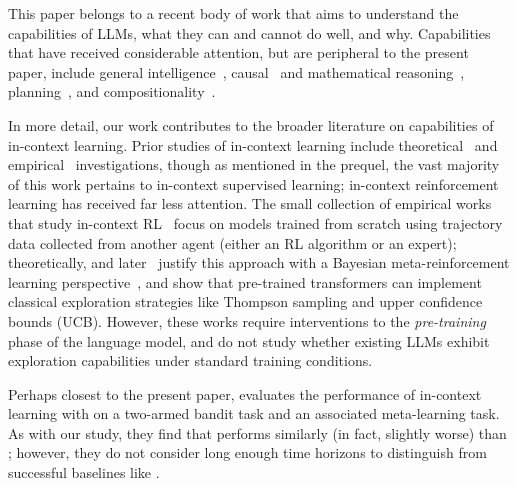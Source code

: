 This paper belongs to a recent body of work that aims to understand the capabilities of LLMs, \ie what they can and cannot do well, and why.
Capabilities that have received considerable attention, but are peripheral to the present paper, include general intelligence~\citep{bubeck2023sparks,binz2023using}, causal~\citep{kiciman2023causal,yiu2023imitation} and mathematical reasoning~\citep{cobbe2021training,lu2023mathvista}, planning~\citep{valmeekam2023planbench,momennejad2023evaluating,brooks2023large}, and compositionality~\citep{yu2023skill}.

In more detail, our work contributes to the broader literature on capabilities of in-context learning.
Prior studies of in-context learning include theoretical~\citep{xie2021explanation,akyurek2022learning,zhang2023and,abernethy2023mechanism,zhang2023trained,han2023explaining,cheng2023transformers,ahn2023transformers,wies2023learnability,fu2023transformers,wu2023many,huang2023context,hendel2023context,li2023transformers,von2023transformers,bai2023transformers,hahn2023theory,jeon2024information} and empirical~\citep{garg2022can,kirsch2022general,ahuja2023context,han2023understanding,raventos2023pretraining,weber2023icl,bhattamishra2023understanding,guo2023transformers,shen2023pretrained,akyurek2024context} investigations, though as
mentioned in the prequel, the vast majority of this work pertains to in-context
supervised learning; in-context reinforcement learning has received far less attention. The small collection of empirical
works that study in-context RL~\citep{laskin2022context,lee2023supervised,raparthy2023generalization,xu2022prompting} focus on models trained from scratch using trajectory data collected
from another agent (either an RL algorithm or an
expert); theoretically, \citet{lee2023supervised} and
later~\citet{lin2023transformers} justify this approach with a Bayesian
meta-reinforcement learning perspective~\citep{simchowitz2021bayesian},
and show that pre-trained transformers can implement classical
exploration strategies like Thompson sampling and upper confidence
bounds (UCB). However, these works require interventions to the
\emph{pre-training} phase of the language model, and do not study
whether existing LLMs exhibit exploration capabilities under standard
training conditions.

Perhaps closest to the present paper, \citet{coda2023meta} evaluates the performance of in-context learning with \gptthree on a two-armed bandit task and an associated meta-learning task. As with our study, they find that \gptthree performs similarly (in fact, slightly worse) than \greedy; however, they do not consider long enough time horizons to distinguish \greedy from successful baselines like \ucb. 

